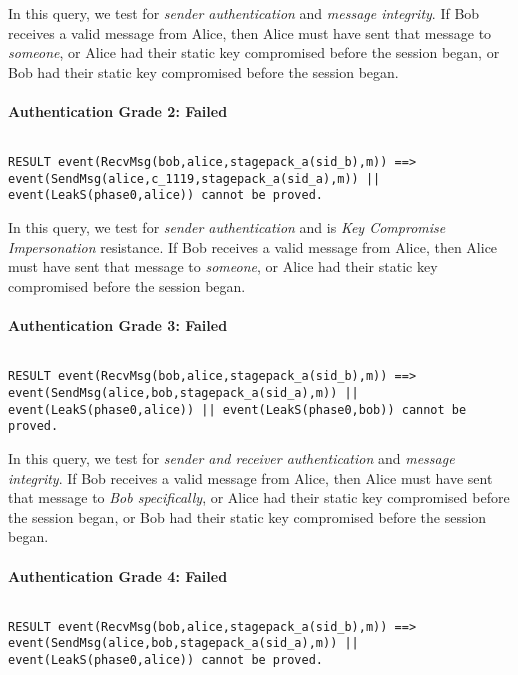 In this query, we test for \emph{sender authentication} and \emph{message integrity}. If Bob receives a valid message from Alice, then Alice must have sent that message to \emph{someone}, or Alice had their static key compromised before the session began, or Bob had their static key compromised before the session began.


\paragraph{Authentication Grade 2: Failed}$ $
\begin{lstlisting}
RESULT event(RecvMsg(bob,alice,stagepack_a(sid_b),m)) ==> event(SendMsg(alice,c_1119,stagepack_a(sid_a),m)) || event(LeakS(phase0,alice)) cannot be proved.
\end{lstlisting}

In this query, we test for \emph{sender authentication} and is \emph{Key Compromise Impersonation} resistance. If Bob receives a valid message from Alice, then Alice must have sent that message to \emph{someone}, or Alice had their static key compromised before the session began.


\paragraph{Authentication Grade 3: Failed}$ $
\begin{lstlisting}
RESULT event(RecvMsg(bob,alice,stagepack_a(sid_b),m)) ==> event(SendMsg(alice,bob,stagepack_a(sid_a),m)) || event(LeakS(phase0,alice)) || event(LeakS(phase0,bob)) cannot be proved.
\end{lstlisting}

In this query, we test for \emph{sender and receiver authentication} and \emph{message integrity}. If Bob receives a valid message from Alice, then Alice must have sent that message to \emph{Bob specifically}, or Alice had their static key compromised before the session began, or Bob had their static key compromised before the session began.


\paragraph{Authentication Grade 4: Failed}$ $
\begin{lstlisting}
RESULT event(RecvMsg(bob,alice,stagepack_a(sid_b),m)) ==> event(SendMsg(alice,bob,stagepack_a(sid_a),m)) || event(LeakS(phase0,alice)) cannot be proved.
\end{lstlisting}

